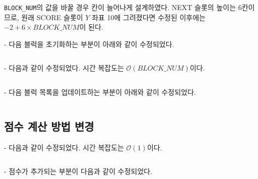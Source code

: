 \texttt{BLOCK_NUM}의 값을 바꿀 경우 칸이 늘어나게 설계하였다. NEXT 슬롯의 높이는 6칸이므로, 원래 SCORE 슬롯이 $Y$ 좌표 10에 그려졌다면
수정된 이후에는 $-2 + 6 \times BLOCK\_NUM$이 된다.

 - 다음 블럭을 초기화하는 부분이 아래와 같이 수정되었다.
\inputminted[xleftmargin=\parindent,linenos,firstline=54,lastline=56]{c}{inc-sources/tetris-week09-homework.c}

 - 다음과 같이 수정되었다. 시간 복잡도는 $\mathcal{O}\left(BLOCK\_NUM\right)$이다.
\inputminted[xleftmargin=\parindent,linenos,firstline=174,lastline=188]{c}{inc-sources/tetris-week09-homework.c}

 - 다음 블럭 목록을 업데이트하는 부분이 아래와 같이 수정되었다.
\inputminted[xleftmargin=\parindent,linenos,firstline=315,lastline=317]{c}{inc-sources/tetris-week09-homework.c}

\subsection{점수 계산 방법 변경}
 - 다음과 같이 수정되었다. 시간 복잡도는 $\mathcal{O}\left(1\right)$이다.
\inputminted[xleftmargin=\parindent,linenos,firstline=329,lastline=351]{c}{inc-sources/tetris-week09-homework.c}

 - 점수가 추가되는 부분이 다음과 같이 수정되었다.
\inputminted[xleftmargin=\parindent,linenos,firstline=308,lastline=324]{c}{inc-sources/tetris-week09-homework.c}



